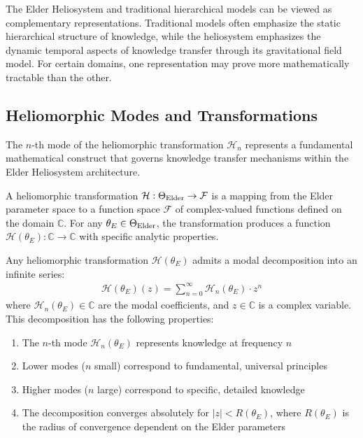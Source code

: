 \begin{remark}
The Elder Heliosystem and traditional hierarchical models can be viewed as complementary representations. Traditional models often emphasize the static hierarchical structure of knowledge, while the heliosystem emphasizes the dynamic temporal aspects of knowledge transfer through its gravitational field model. For certain domains, one representation may prove more mathematically tractable than the other.
\end{remark}

\subsection{Heliomorphic Modes and Transformations}

The $n$-th mode of the heliomorphic transformation $\mathcal{H}_n$ represents a fundamental mathematical construct that governs knowledge transfer mechanisms within the Elder Heliosystem architecture.

\begin{definition}
A heliomorphic transformation $\mathcal{H}: \Theta_{\text{Elder}} \rightarrow \mathcal{F}$ is a mapping from the Elder parameter space to a function space $\mathcal{F}$ of complex-valued functions defined on the domain $\mathbb{C}$. For any $\theta_E \in \Theta_{\text{Elder}}$, the transformation produces a function $\mathcal{H}(\theta_E): \mathbb{C} \rightarrow \mathbb{C}$ with specific analytic properties.
\end{definition}

\begin{theorem}
Any heliomorphic transformation $\mathcal{H}(\theta_E)$ admits a modal decomposition into an infinite series:
\begin{align}
\mathcal{H}(\theta_E)(z) = \sum_{n=0}^{\infty} \mathcal{H}_n(\theta_E) \cdot z^n
\end{align}
where $\mathcal{H}_n(\theta_E) \in \mathbb{C}$ are the modal coefficients, and $z \in \mathbb{C}$ is a complex variable. This decomposition has the following properties:
\begin{enumerate}
    \item The $n$-th mode $\mathcal{H}_n(\theta_E)$ represents knowledge at frequency $n$
    \item Lower modes ($n$ small) correspond to fundamental, universal principles
    \item Higher modes ($n$ large) correspond to specific, detailed knowledge
    \item The decomposition converges absolutely for $|z| < R(\theta_E)$, where $R(\theta_E)$ is the radius of convergence dependent on the Elder parameters
\end{enumerate}
\end{theorem}

